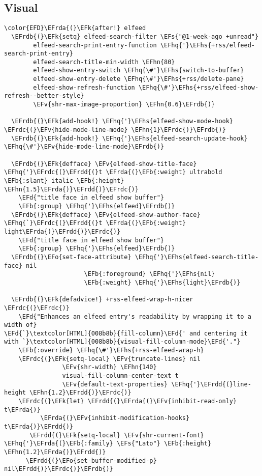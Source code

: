 \documentclass[c]{article}
\theoremstyle{plain}%
\theoremstyle{definition}
\theoremstyle{remark}
\newcommand{\EFs}[1]{\textcolor{EFs}{#1}} %
\newcommand{\EFd}[1]{\textcolor{EFd}{#1}} %
\newcommand{\EFk}[1]{\textcolor{EFk}{#1}} %
\newcommand{\EFb}[1]{\textcolor{EFb}{#1}} %
\newcommand{\EFv}[1]{\textcolor{EFv}{#1}} %
\newcommand{\EFo}[1]{\textcolor{EFo}{#1}} %
\newcommand{\EFhn}[1]{\textcolor{EFhn}{\textbf{#1}}} %
\newcommand{\EFhq}[1]{\textcolor{EFhq}{#1}} %
\newcommand{\EFhs}[1]{\textcolor{EFhs}{#1}} %
\newcommand{\EFrda}[1]{\textcolor{EFrda}{#1}} %
\newcommand{\EFrdb}[1]{\textcolor{EFrdb}{#1}} %
\newcommand{\EFrdc}[1]{\textcolor{EFrdc}{#1}} %
\newcommand{\EFrdd}[1]{\textcolor{EFrdd}{#1}} %
\begin{document}
\subsection{Visual}
\label{sec:org18edba1}
\begin{Code}
\begin{Verbatim}
\color{EFD}\EFrda{(}\EFk{after!} elfeed
  \EFrdb{(}\EFk{setq} elfeed-search-filter \EFs{"@1-week-ago +unread"}
        elfeed-search-print-entry-function \EFhq{'}\EFhs{+rss/elfeed-search-print-entry}
        elfeed-search-title-min-width \EFhn{80}
        elfeed-show-entry-switch \EFhq{\#'}\EFhs{switch-to-buffer}
        elfeed-show-entry-delete \EFhq{\#'}\EFhs{+rss/delete-pane}
        elfeed-show-refresh-function \EFhq{\#'}\EFhs{+rss/elfeed-show-refresh--better-style}
        \EFv{shr-max-image-proportion} \EFhn{0.6}\EFrdb{)}

  \EFrdb{(}\EFk{add-hook!} \EFhq{'}\EFhs{elfeed-show-mode-hook} \EFrdc{(}\EFv{hide-mode-line-mode} \EFhn{1}\EFrdc{)}\EFrdb{)}
  \EFrdb{(}\EFk{add-hook!} \EFhq{'}\EFhs{elfeed-search-update-hook} \EFhq{\#'}\EFv{hide-mode-line-mode}\EFrdb{)}

  \EFrdb{(}\EFk{defface} \EFv{elfeed-show-title-face} \EFhq{'}\EFrdc{(}\EFrdd{(}t \EFrda{(}\EFb{:weight} ultrabold \EFb{:slant} italic \EFb{:height} \EFhn{1.5}\EFrda{)}\EFrdd{)}\EFrdc{)}
    \EFd{"title face in elfeed show buffer"}
    \EFb{:group} \EFhq{'}\EFhs{elfeed}\EFrdb{)}
  \EFrdb{(}\EFk{defface} \EFv{elfeed-show-author-face} \EFhq{`}\EFrdc{(}\EFrdd{(}t \EFrda{(}\EFb{:weight} light\EFrda{)}\EFrdd{)}\EFrdc{)}
    \EFd{"title face in elfeed show buffer"}
    \EFb{:group} \EFhq{'}\EFhs{elfeed}\EFrdb{)}
  \EFrdb{(}\EFo{set-face-attribute} \EFhq{'}\EFhs{elfeed-search-title-face} nil
                      \EFb{:foreground} \EFhq{'}\EFhs{nil}
                      \EFb{:weight} \EFhq{'}\EFhs{light}\EFrdb{)}

  \EFrdb{(}\EFk{defadvice!} +rss-elfeed-wrap-h-nicer \EFrdc{(}\EFrdc{)}
    \EFd{"Enhances an elfeed entry's readability by wrapping it to a width of}
\EFd{`}\textcolor[HTML]{008b8b}{fill-column}\EFd{' and centering it with `}\textcolor[HTML]{008b8b}{visual-fill-column-mode}\EFd{'."}
    \EFb{:override} \EFhq{\#'}\EFhs{+rss-elfeed-wrap-h}
    \EFrdc{(}\EFk{setq-local} \EFv{truncate-lines} nil
                \EFv{shr-width} \EFhn{140}
                visual-fill-column-center-text t
                \EFv{default-text-properties} \EFhq{'}\EFrdd{(}line-height \EFhn{1.2}\EFrdd{)}\EFrdc{)}
    \EFrdc{(}\EFk{let} \EFrdd{(}\EFrda{(}\EFv{inhibit-read-only} t\EFrda{)}
          \EFrda{(}\EFv{inhibit-modification-hooks} t\EFrda{)}\EFrdd{)}
       \EFrdd{(}\EFk{setq-local} \EFv{shr-current-font} \EFhq{'}\EFrda{(}\EFb{:family} \EFs{"Lato"} \EFb{:height} \EFhn{1.2}\EFrda{)}\EFrdd{)}
      \EFrdd{(}\EFo{set-buffer-modified-p} nil\EFrdd{)}\EFrdc{)}\EFrdb{)}


\end{Verbatim}
\end{Code}
\end{document}
